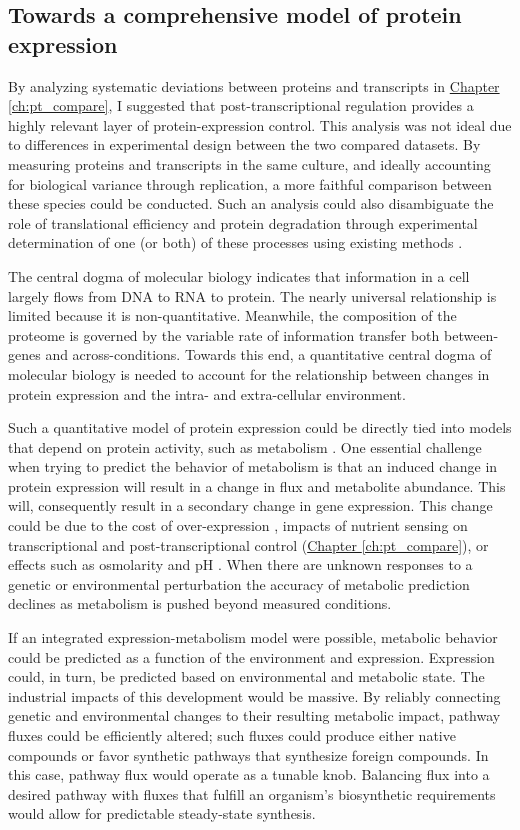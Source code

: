 \subsection{Towards a comprehensive model of protein expression}

By analyzing systematic deviations between proteins and transcripts in \hyperref[ch:pt_compare]{Chapter \ref{ch:pt_compare}}, I suggested that post-transcriptional regulation provides a highly relevant layer of protein-expression control. This analysis was not ideal due to differences in experimental design between the two compared datasets. By measuring proteins and transcripts in the same culture, and ideally accounting for biological variance through replication, a more faithful comparison between these species could be conducted.  Such an analysis could also disambiguate the role of translational efficiency and protein degradation through experimental determination of one (or both) of these processes using existing methods \cite{Ingolia:2009dp, Belle:2006hv}.

The central dogma of molecular biology indicates that information in a cell largely flows from DNA to RNA to protein. The nearly universal relationship is limited because it is non-quantitative. Meanwhile, the composition of the proteome is governed by the variable rate of information transfer both between-genes and across-conditions. Towards this end, a quantitative central dogma of molecular biology is needed to account for the relationship between changes in protein expression and the intra- and extra-cellular environment.

Such a quantitative model of protein expression could be directly tied into models that depend on protein activity, such as metabolism \cite{OBrien:2013fl}.  One essential challenge when trying to predict the behavior of metabolism is that an induced change in protein expression will result in a change in flux and metabolite abundance. This will, consequently result in a secondary change in gene expression. This change could be due to the cost of over-expression \cite{Dykhuizen:1987uq}, impacts of nutrient sensing on transcriptional \cite{Brauer:2008jn} and post-transcriptional control (\hyperref[ch:pt_compare]{Chapter \ref{ch:pt_compare}}), or effects such as osmolarity and pH \cite{Csonka:1991wf}. When there are unknown responses to a genetic or environmental perturbation the accuracy of metabolic prediction declines as metabolism is pushed beyond measured conditions.

If an integrated expression-metabolism model were possible, metabolic behavior could be predicted as a function of the environment and expression. Expression could, in turn, be predicted based on environmental and metabolic state. The industrial impacts of this development would be massive. By reliably connecting genetic and environmental changes to their resulting metabolic impact, pathway fluxes could be efficiently altered; such fluxes could produce either native compounds or favor synthetic pathways that synthesize foreign compounds. In this case, pathway flux would operate as a tunable knob. Balancing flux into a desired pathway with fluxes that fulfill an organism's biosynthetic requirements would allow for predictable steady-state synthesis. 

